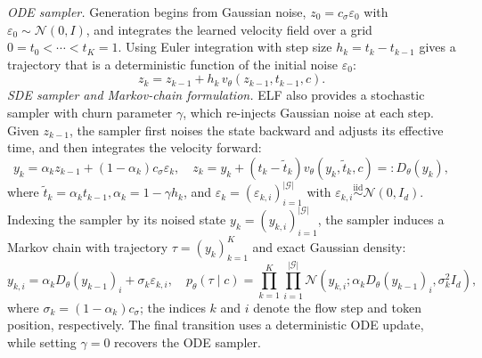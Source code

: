 \emph{ODE sampler.} Generation begins from Gaussian noise, $z_0=c_\sigma\varepsilon_0$ with $\varepsilon_0\sim\mathcal N(0,I)$, and integrates the learned velocity field over a grid $0=t_0<\cdots<t_K=1$. Using Euler integration with step size $h_k=t_k-t_{k-1}$ gives a trajectory that is a deterministic function of the initial noise $\varepsilon_0$:
\begin{equation}
z_k=z_{k-1}+h_k\,v_\theta(z_{k-1},t_{k-1},c).
\end{equation}
\emph{SDE sampler and Markov-chain formulation.} ELF also provides a stochastic sampler with churn parameter $\gamma$, which re-injects Gaussian noise at each step. Given $z_{k-1}$, the sampler first noises the state backward and adjusts its effective time, and then integrates the velocity forward:
\begin{equation}
y_k=\alpha_k z_{k-1}+(1-\alpha_k)c_\sigma\varepsilon_k,\quad z_k=y_k+(t_k-\tilde t_k)v_\theta(y_k,\tilde t_k,c)=:D_\theta(y_k) ,
\end{equation}
where $\tilde t_k=\alpha_k t_{k-1}, \alpha_k=1-\gamma h_k$, and $\varepsilon_k=(\varepsilon_{k,i})_{i=1}^{|\mathcal G|}$ with $\varepsilon_{k,i}\overset{\mathrm{iid}}{\sim}\mathcal N(0,I_d)$. Indexing the sampler by its noised state $y_k=(y_{k,i})_{i=1}^{|\mathcal G|}$, the sampler induces a Markov chain with trajectory $\tau=(y_k)_{k=1}^{K}$ and exact Gaussian density:
\begin{equation}
y_{k,i}=\alpha_kD_\theta(y_{k-1})_i+\sigma_k\varepsilon_{k,i}, \quad p_\theta(\tau\mid c)=\prod_{k=1}^{K}\prod_{i=1}^{|\mathcal G|}\mathcal N\!\left(y_{k,i};\alpha_kD_\theta(y_{k-1})_i,\sigma_k^2I_d\right),  
\label{eq:chain}
\end{equation}
where $\sigma_k=(1-\alpha_k)c_\sigma$; the indices $k$ and $i$ denote the flow step and token position, respectively. The final transition uses a deterministic ODE update, while setting $\gamma=0$ recovers the ODE sampler.


